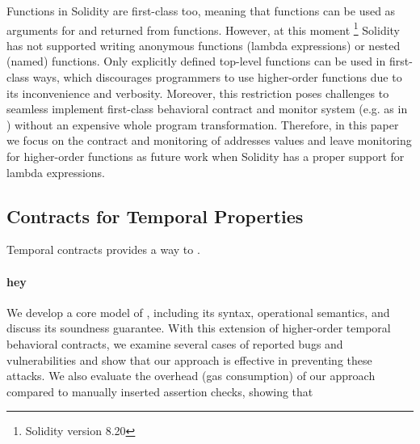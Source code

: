 Functions in Solidity are first-class too, meaning that functions can be used as
arguments for and returned from functions. However, at this moment
\footnote{Solidity version 8.20} Solidity has not supported writing anonymous
functions (lambda expressions) or nested (named) functions.
Only explicitly defined top-level functions can be used in first-class ways,
which discourages programmers to use higher-order functions due to its
inconvenience and verbosity.
Moreover, this restriction poses challenges to seamless implement first-class
behavioral contract and monitor system (e.g. as in \cite{DBLP:conf/icfp/FindlerF02})
without an expensive whole program transformation.
Therefore, in this paper we focus on the contract and monitoring of addresses values
and leave monitoring for higher-order functions as future work when
Solidity has a proper support for lambda expressions.


\subsection*{\textbf{Contracts for Temporal Properties}}

Temporal contracts provides a way to .

\paragraph{hey}

We develop a core model of \lang, including its syntax, operational semantics,
and discuss its soundness guarantee.
With this extension of higher-order temporal behavioral contracts, we examine
several cases of reported bugs and vulnerabilities and show that
our approach is effective in preventing these attacks.
We also evaluate the overhead (gas consumption) of our approach
compared to manually inserted assertion checks, showing that 




